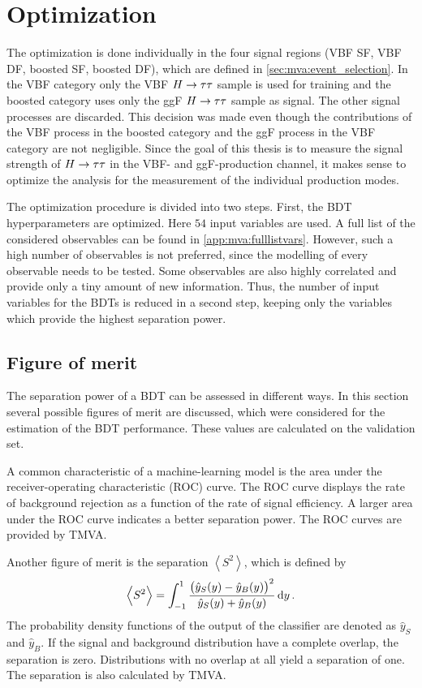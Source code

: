 \section{Optimization}\label{sec:mva:optimization}

The optimization is done individually in the four signal regions (VBF SF, VBF DF, boosted SF, boosted DF), which are defined in \cref{sec:mva:event_selection}.
In the VBF category only the VBF $H \to \tau \tau$ sample is used for training and the boosted category uses only the ggF $H \to \tau \tau$ sample as signal.
The other signal processes are discarded.
This decision was made even though the contributions of the VBF process in the boosted category and
the ggF process in the VBF category are not negligible.
Since the goal of this thesis is to measure the signal strength of $H \to \tau \tau$ in the VBF- and ggF-production channel,
it makes sense to optimize the analysis for the measurement of the individual production modes.

The optimization procedure is divided into two steps.
First, the BDT hyperparameters are optimized. Here $54$ input variables are used. A full list of the considered observables can be found in \cref{app:mva:fulllistvars}.
However, such a high number of observables is not preferred, since the modelling of every observable needs to be tested.
Some observables are also highly correlated and provide only a tiny amount of new information.
Thus, the number of input variables for the BDTs is reduced in a second step, keeping only the variables which provide
the highest separation power.

\subsection{Figure of merit}\label{sub:mva:optimization:fom}

The separation power of a BDT can be assessed in different ways.
In this section several possible figures of merit are discussed,
which were considered for the estimation of the BDT performance.
These values are calculated on the validation set.

A common characteristic of a machine-learning model is the area under the receiver-operating characteristic (ROC) curve.
The ROC curve displays the rate of background rejection as a function of the rate of signal efficiency.
A larger area under the ROC curve indicates a better separation power.
The ROC curves are provided by TMVA\@.

Another figure of merit is the separation $\left<S^2\right>$, which is defined by~\cite{TMVA}
\begin{equation}
    \left<S^2\right> = \int_{-1}^1 \frac{{\left(\hat{y}_S(y) - \hat{y}_B(y)\right)}^2}{\hat{y}_S(y) + \hat{y}_B(y)} \dif y \,.
\end{equation}
The probability density functions of the output of the classifier are denoted as $\hat{y}_S$ and $\hat{y}_B$.
If the signal and background distribution have a complete overlap, the separation is zero.
Distributions with no overlap at all yield a separation of one.
The separation is also calculated by TMVA\@.

